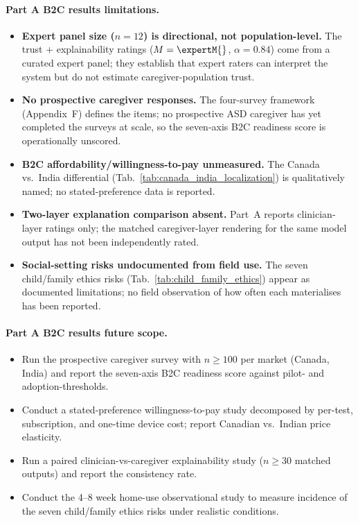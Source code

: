 \paragraph{Part A B2C results limitations.}
\begin{itemize}[leftmargin=*, itemsep=2pt]
    \item \textbf{Expert panel size ($n = 12$) is directional, not population-level.} The trust + explainability ratings ($M = \expertM{}$, $\alpha = 0.84$) come from a curated expert panel; they establish that expert raters can interpret the system but do not estimate caregiver-population trust.
    \item \textbf{No prospective caregiver responses.} The four-survey framework (Appendix~F) defines the items; no prospective ASD caregiver has yet completed the surveys at scale, so the seven-axis B2C readiness score is operationally unscored.
    \item \textbf{B2C affordability/willingness-to-pay unmeasured.} The Canada vs.\ India differential (Tab.~\ref{tab:canada_india_localization}) is qualitatively named; no stated-preference data is reported.
    \item \textbf{Two-layer explanation comparison absent.} Part~A reports clinician-layer ratings only; the matched caregiver-layer rendering for the same model output has not been independently rated.
    \item \textbf{Social-setting risks undocumented from field use.} The seven child/family ethics risks (Tab.~\ref{tab:child_family_ethics}) appear as documented limitations; no field observation of how often each materialises has been reported.
\end{itemize}

\paragraph{Part A B2C results future scope.}
\begin{itemize}[leftmargin=*, itemsep=2pt]
    \item Run the prospective caregiver survey with $n \geq 100$ per market (Canada, India) and report the seven-axis B2C readiness score against pilot- and adoption-thresholds.
    \item Conduct a stated-preference willingness-to-pay study decomposed by per-test, subscription, and one-time device cost; report Canadian vs.\ Indian price elasticity.
    \item Run a paired clinician-vs-caregiver explainability study ($n \geq 30$ matched outputs) and report the consistency rate.
    \item Conduct the 4--8 week home-use observational study to measure incidence of the seven child/family ethics risks under realistic conditions.
\end{itemize}

